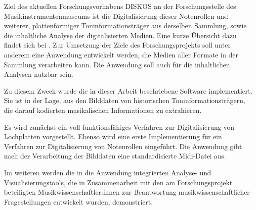 Ziel des aktuellen Forschungsvorhabens DISKOS an der Forschungsstelle des Musikinstrumentenmuseums ist die Digitalisierung dieser Notenrollen und weiterer, plattenförmiger Toninformationsträger aus derselben Sammlung, sowie die inhaltliche Analyse der digitalisierten Medien.
Eine kurze Übersicht dazu findet sich bei \textcite[]{khulusi_2022}.
Zur Umsetzung der Ziele des Forschungsprojekts soll unter anderem eine Anwendung entwickelt werden, die Medien aller Formate in der Sammlung verarbeiten kann.
Die Anwendung soll auch für die inhaltlichen Analysen nutzbar sein.

Zu diesem Zweck wurde die in dieser Arbeit beschriebene Software implementiert.
Sie ist in der Lage, aus den Bilddaten von historischen Toninformationsträgern, die darauf kodierten musikalischen Informationen zu extrahieren.

Es wird zunächst ein voll funktionsfähiges Verfahren zur Digitalisierung von Lochplatten vorgestellt.
Ebenso wird eine erste Implementierung für ein Verfahren zur Digitalisierung von Notenrollen eingeführt.
Die Anwendung gibt nach der Verarbeitung der Bilddaten eine standardisierte Midi-Datei aus.

Im weiteren werden die in die Anwendung integrierten Analyse- und Visualisierungstools, die in Zusammenarbeit mit den am Forschungsprojekt beteiligten Musikwissenschaftler:innen zur Beantwortung musikwissenschaftlicher Fragestellungen entwickelt wurden, demonstriert.

